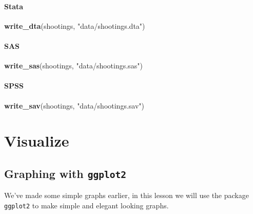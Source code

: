 \documentclass[
  12pt,
]{book}
\newenvironment{Shaded}{\begin{snugshade}}{\end{snugshade}}
\newcommand{\KeywordTok}[1]{\textcolor[rgb]{0.13,0.29,0.53}{\textbf{#1}}}
\newcommand{\NormalTok}[1]{#1}
\newcommand{\StringTok}[1]{\textcolor[rgb]{0.31,0.60,0.02}{#1}}
\begin{document}
\hypertarget{stata-1}{%
\subsection{Stata}\label{stata-1}}

\begin{Shaded}
\begin{Highlighting}[]
\KeywordTok{write\_dta}\NormalTok{(shootings, }\StringTok{"data/shootings.dta"}\NormalTok{)}
\end{Highlighting}
\end{Shaded}

\hypertarget{sas-1}{%
\subsection{SAS}\label{sas-1}}

\begin{Shaded}
\begin{Highlighting}[]
\KeywordTok{write\_sas}\NormalTok{(shootings, }\StringTok{"data/shootings.sas"}\NormalTok{)}
\end{Highlighting}
\end{Shaded}

\hypertarget{spss-1}{%
\subsection{SPSS}\label{spss-1}}

\begin{Shaded}
\begin{Highlighting}[]
\KeywordTok{write\_sav}\NormalTok{(shootings, }\StringTok{"data/shootings.sav"}\NormalTok{)}
\end{Highlighting}
\end{Shaded}

\hypertarget{part-visualize}{%
\part{Visualize}\label{part-visualize}}

\hypertarget{graphing-intro}{%
\chapter{\texorpdfstring{Graphing with \texttt{ggplot2}}{Graphing with ggplot2}}\label{graphing-intro}}

We've made some simple graphs earlier, in this lesson we will use the package \texttt{ggplot2} to make simple and elegant looking graphs.
\end{document}
